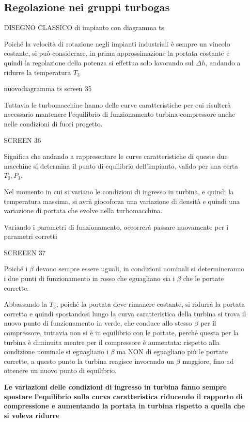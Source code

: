 \documentclass[a4paper, 15pt]{article}
\begin{document}
\subsection{Regolazione nei gruppi turbogas}
\begin{adjustwidth}{2in}{}
	DISEGNO CLASSICO di impianto con diagramma ts
	
	Poiché la velocità di rotazione negli impianti industriali è sempre un vincolo costante, si può considerare, in prima approssimazione la portata costante e quindi la regolazione della potenza si effettua solo lavorando sul $\Delta h$, andando a ridurre la temperatura $T_3$
	
	nuovodiagramma ts screen 35 
	
	Tuttavia le turbomacchine hanno delle curve caratteristiche per cui risulterà necessario mantenere l'equilibrio di funzionamento turbina-compressore anche nelle condizioni di fuori progetto. 
	
	SCREEN 36
	
	Significa che andando a rappresentare le curve caratteristiche di queste due macchine si determina il punto di equilibrio dell'impianto, valido per una certa $T_3, P_3$. 
	
	Nel momento in cui si variano le condizioni di ingresso in turbina, e quindi la temperatura massima, si avrà  giocoforza una variazione di densità e quindi una variazione di portata che evolve nella turbomacchina. \newline 
	
	Variando i parametri di funzionamento, occorrerà passare nuovamente per i parametri corretti
	
	SCREEEN 37
	
	Poiché i $\beta$ devono sempre essere uguali, in condizioni nominali si determineranno i due punti di funzionamento in rosso che eguagliano sia i $\beta$ che le portate corrette.
	
	Abbassando la $T_3$, poiché la portata deve rimanere costante, si ridurrà la portata corretta e quindi spostandosi lungo la curva caratteristica della turbina si trova il nuovo punto di funzionamento in verde, che conduce allo stesso $\beta$ per il compressore, tuttavia non si è in equilibrio con le portate, perché questa per la turbina è diminuita mentre per il compressore è aumentata: rispetto alla condizione nominale si eguagliano i $\beta$ ma NON di eguagliano più le portate corrette, a questo punto la turbina reagisce invocando un $\beta$ maggiore, fino ad ottenere un nuovo punto di equilibrio.\newline 
	
	\begin{center}
		\textbf{Le variazioni delle condizioni di ingresso in turbina fanno sempre spostare l'equilibrio sulla curva caratteristica riducendo il rapporto di compressione e aumentando la portata in turbina rispetto a quella che si voleva ridurre}
	\end{center}

\end{adjustwidth}
\end{document}

